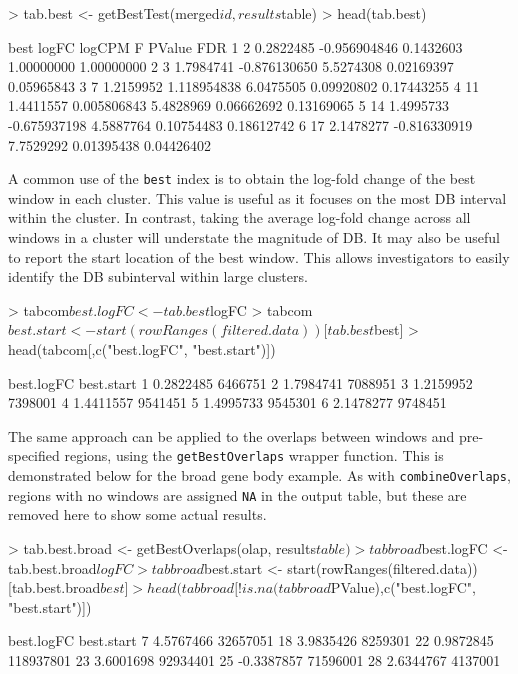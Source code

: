 \documentclass[12pt]{report}
\renewenvironment{Schunk}{\vspace{0pt}}{\vspace{0pt}}
\newcommand{\code}[1]{{\small\texttt{#1}}}
\begin{document}
\begin{Schunk}
\begin{Sinput}
> tab.best <- getBestTest(merged$id, results$table)
> head(tab.best)
\end{Sinput}
\begin{Soutput}
  best     logFC       logCPM         F     PValue        FDR
1    2 0.2822485 -0.956904846 0.1432603 1.00000000 1.00000000
2    3 1.7984741 -0.876130650 5.5274308 0.02169397 0.05965843
3    7 1.2159952  1.118954838 6.0475505 0.09920802 0.17443255
4   11 1.4411557  0.005806843 5.4828969 0.06662692 0.13169065
5   14 1.4995733 -0.675937198 4.5887764 0.10754483 0.18612742
6   17 2.1478277 -0.816330919 7.7529292 0.01395438 0.04426402
\end{Soutput}
\end{Schunk}

A common use of the \code{best} index is to obtain the log-fold change of the best window in each cluster.
This value is useful as it focuses on the most DB interval within the cluster.
In contrast, taking the average log-fold change across all windows in a cluster will understate the magnitude of DB.
It may also be useful to report the start location of the best window.
This allows investigators to easily identify the DB subinterval within large clusters.

\begin{Schunk}
\begin{Sinput}
> tabcom$best.logFC <- tab.best$logFC
> tabcom$best.start <- start(rowRanges(filtered.data))[tab.best$best]
> head(tabcom[,c("best.logFC", "best.start")])
\end{Sinput}
\begin{Soutput}
  best.logFC best.start
1  0.2822485    6466751
2  1.7984741    7088951
3  1.2159952    7398001
4  1.4411557    9541451
5  1.4995733    9545301
6  2.1478277    9748451
\end{Soutput}
\end{Schunk}

The same approach can be applied to the overlaps between windows and pre-specified regions, using the \code{getBestOverlaps} wrapper function.
This is demonstrated below for the broad gene body example.
As with \code{combineOverlaps}, regions with no windows are assigned \code{NA} in the output table, but these are removed here to show some actual results.

\begin{Schunk}
\begin{Sinput}
> tab.best.broad <- getBestOverlaps(olap, results$table)
> tabbroad$best.logFC <- tab.best.broad$logFC
> tabbroad$best.start <- start(rowRanges(filtered.data))[tab.best.broad$best]
> head(tabbroad[!is.na(tabbroad$PValue),c("best.logFC", "best.start")])
\end{Sinput}
\begin{Soutput}
   best.logFC best.start
7   4.5767466   32657051
18  3.9835426    8259301
22  0.9872845  118937801
23  3.6001698   92934401
25 -0.3387857   71596001
28  2.6344767    4137001
\end{Soutput}
\end{Schunk}
\end{document}
